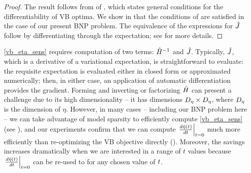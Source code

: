%
\begin{proof}
%
The result follows from  of ,
which states general conditions for the differentiability of VB optima.  We show
in  that the conditions
of  are satisfied in the case of our present BNP problem. The
equivalence of the expressions for $\hat J$ follow by differentiating
through the expectation; see  for more details.
%
\end{proof}
%

\eqref{vb_eta_sens} requires computation of two terms: $\hat{H}^{-1}$ and
$\hat J$.  Typically, $\hat J$, which is a derivative of a
variational expectation, is straightforward to evaluate: the requisite
expectation is evaluated either in closed form or approximated numerically;
then, in either case, an application of automatic differentiation provides the
gradient. Forming and inverting or factorizing $\hat{H}$ can present a
challenge due to its high dimensionality -- it has dimensions ${D_{\eta}}
\times {D_{\eta}}$, where ${D_{\eta}}$ is the dimension of $\eta$.
However, in many cases -- including our BNP problem here --
we can take advantage of model sparsity to efficiently compute
\eqref{vb_eta_sens} (see ), and
our experiments confirm that we can compute $\left.\frac{d \hat\eta(t)}{d t}\right\vert_{t=0}$
much more efficiently than re-optimizing the VB objective directly
(). Moreover,
the savings increases dramatically when we are interested in a range of $t$
values because $\left.\frac{d \hat\eta(t)}{d t}\right\vert_{t=0}$ can be re-used to
for any chosen value of $t$.

